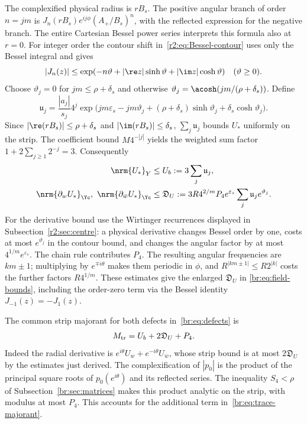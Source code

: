 The complexified physical radius is $rB_s$. The positive angular branch
of order $n=jm$ is
$J_n(rB_s)e^{ij\phi}(A_+/B_s)^n$, with the reflected expression for
the negative branch. The entire Cartesian Bessel power series interprets
this formula also at $r=0$. For integer order the contour shift
in~\eqref{r2:eq:Bessel-contour} uses only the Bessel integral and gives
\[
 |J_n(z)|\le
 \exp(-n\vartheta+|\re z|\sinh\vartheta+|\im z|\cosh\vartheta)
 \quad(\vartheta\ge0).
\]
Choose $\vartheta_j=0$ for $jm\le\rho+\delta_s$ and otherwise
$\vartheta_j=\acosh(jm/(\rho+\delta_s))$. Define
\begin{equation}\label{br:eq:strip-summands}
 \mathfrak u_j=\frac{|a_j|}{s_j}4^j
 \exp\bigl(jm\varepsilon_s-jm\vartheta_j
       +(\rho+\delta_s)\sinh\vartheta_j+\delta_s\cosh\vartheta_j\bigr).
\end{equation}
Since $|\re(rB_s)|\le\rho+\delta_s$ and $|\im(rB_s)|\le\delta_s$,
$\sum_j\mathfrak u_j$ bounds $U_*$ uniformly on the strip. The coefficient
bound $M4^{-|j|}$ yields the weighted sum factor
$1+2\sum_{j\ge1}2^{-j}=3$. Consequently
\begin{equation}\label{br:eq:field-bounds}
 \begin{split}
 \nrm{U_*}_Y&\le U_b:=3\sum_j\mathfrak u_j,\\
 \nrm{\partial_wU_*}_{\Yc},\ \nrm{\partial_{\bar w}U_*}_{\Yc}
 &\le \mathfrak D_U:=3R4^{2/m}P_4e^{\varepsilon_s}
                      \sum_j\mathfrak u_je^{\vartheta_j}.
 \end{split}
\end{equation}
For the derivative bound use the Wirtinger recurrences displayed in
Subsection~\ref{r2:sec:centre}: a physical derivative changes Bessel
order by one, costs at most $e^{\vartheta_j}$ in the contour bound, and
changes the angular factor by at most $4^{1/m}e^{\varepsilon_s}$.
The chain rule contributes $P_4$. The resulting angular frequencies are
$km\pm1$; multiplying by $e^{\mp i\theta}$ makes them periodic in
$\phi$, and $R^{|km\pm1|}\le R2^{|k|}$ costs the further factors
$R4^{1/m}$. These estimates give the enlarged $\mathfrak D_U$ in
\eqref{br:eq:field-bounds}, including the order-zero term via
the Bessel identity $J_{-1}(z)=-J_1(z)$.

The common strip majorant for both defects in~\eqref{br:eq:defects} is
\begin{equation}\label{br:eq:trace-majorant}
 M_{\rm tr}=U_b+2\mathfrak D_U+P_4.
\end{equation}
Indeed the radial derivative is
$e^{i\theta}U_w+e^{-i\theta}U_{\bar w}$, whose strip bound is at most
$2\mathfrak D_U$ by the estimates just derived. The complexification of $|p_0|$
is the product of the principal square roots of $p_0(e^{i\theta})$ and
its reflected series. The inequality $S_4<\rho$ of Subsection~\ref{br:sec:matrices} makes this product analytic on the strip, with modulus at most
$P_4$. This accounts for the additional term in~\eqref{br:eq:trace-majorant}.

